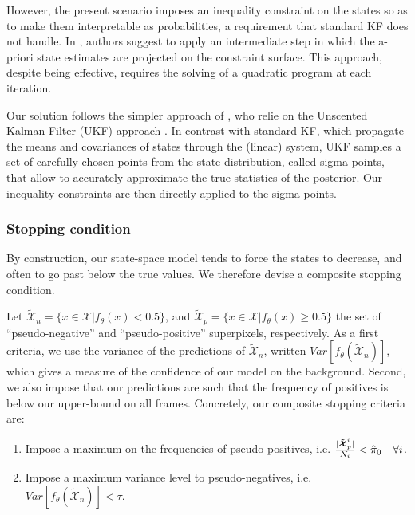 However, the present scenario imposes an inequality constraint on the states so as to make them interpretable as probabilities, a requirement that standard KF does not handle.
In \cite{gupta07}, authors suggest to apply an intermediate step in which the a-priori state estimates are projected on the constraint surface.
This approach, despite being effective, requires the solving of a quadratic program at each iteration.

Our solution follows the simpler approach of \cite{kandepu08}, who relie on the Unscented Kalman Filter (UKF) approach \cite{wan00}.
In contrast with standard KF, which propagate the means and covariances of states through the (linear) system, UKF samples a set of carefully chosen points from the state distribution, called sigma-points, that allow to accurately approximate the true statistics of the posterior.
Our inequality constraints are then directly applied to the sigma-points.

\subsubsection{Stopping condition}
By construction, our state-space model tends to force the states to decrease, and often to go past below the true values.
We therefore devise a composite stopping condition.

Let $\bm{\tilde{\mathcal{X}}}_{n}=\{x \in \bm{\mathcal{X}} | f_{\theta}(x) < 0.5\}$, and $\bm{\tilde{\mathcal{X}}}_{p}=\{x \in \bm{\mathcal{X}} | f_{\theta}(x) \geq 0.5\}$ the set of ``pseudo-negative'' and ``pseudo-positive'' superpixels, respectively.
As a first criteria, we use the variance of the predictions of  $\bm{\tilde{\mathcal{X}}}_{n}$, written $Var[f_{\theta}(\bm{\mathcal{\tilde X}}_{n})]$, which gives a measure of the confidence of our model on the background.
Second, we also impose that our predictions are such that the frequency of positives is below our upper-bound on all frames.
Concretely, our composite stopping criteria are:

\begin{enumerate}
\item Impose a maximum on the frequencies of pseudo-positives, i.e. $\frac{|\bm{\tilde \mathcal{X}}_{p}^{i}|}{N_{i}} < \hat \pi_{0} \quad \forall i$.
\item Impose a maximum variance level to pseudo-negatives, i.e. $Var[f_{\theta}(\bm{\mathcal{\tilde X}}_{n})] < \tau$.
\end{enumerate}

